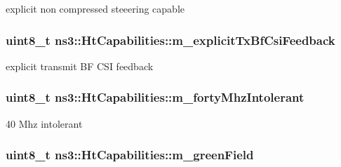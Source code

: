 explicit non compressed steeering capable 

\subsubsection[{\texorpdfstring{m\+\_\+explicit\+Tx\+Bf\+Csi\+Feedback}{m_explicitTxBfCsiFeedback}}]{\setlength{\rightskip}{0pt plus 5cm}uint8\+\_\+t ns3\+::\+Ht\+Capabilities\+::m\+\_\+explicit\+Tx\+Bf\+Csi\+Feedback\hspace{0.3cm}{\ttfamily [private]}}\hypertarget{classns3_1_1HtCapabilities_a6bb0b4be191cae387ee80569df6b376b}{}\label{classns3_1_1HtCapabilities_a6bb0b4be191cae387ee80569df6b376b}


explicit transmit BF C\+SI feedback 

\subsubsection[{\texorpdfstring{m\+\_\+forty\+Mhz\+Intolerant}{m_fortyMhzIntolerant}}]{\setlength{\rightskip}{0pt plus 5cm}uint8\+\_\+t ns3\+::\+Ht\+Capabilities\+::m\+\_\+forty\+Mhz\+Intolerant\hspace{0.3cm}{\ttfamily [private]}}\hypertarget{classns3_1_1HtCapabilities_ab3b109b4deb20db9c7b81d77d924e2d7}{}\label{classns3_1_1HtCapabilities_ab3b109b4deb20db9c7b81d77d924e2d7}


40 Mhz intolerant 

\subsubsection[{\texorpdfstring{m\+\_\+green\+Field}{m_greenField}}]{\setlength{\rightskip}{0pt plus 5cm}uint8\+\_\+t ns3\+::\+Ht\+Capabilities\+::m\+\_\+green\+Field\hspace{0.3cm}{\ttfamily [private]}}\hypertarget{classns3_1_1HtCapabilities_ae36eca280f5e24b104a0ca1ba9d911bb}{}\label{classns3_1_1HtCapabilities_ae36eca280f5e24b104a0ca1ba9d911bb}


